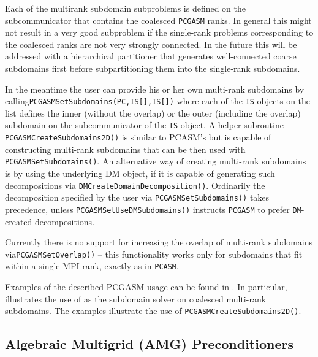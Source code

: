 Each of the multirank subdomain subproblems is defined on the subcommunicator that contains the coalesced
\lstinline{PCGASM} ranks.  In general this might not result in a very good subproblem if the single-rank problems
corresponding to the coalesced ranks are not very strongly connected.  In the future this will be addressed
with a hierarchical partitioner that generates well-connected coarse subdomains first before subpartitioning
them into the single-rank subdomains.

In the meantime the user can provide his or her own multi-rank subdomains by calling\break \lstinline{PCGASMSetSubdomains(PC,IS[],IS[])}
where each of the \lstinline{IS} objects on the list defines the inner (without the overlap) or the outer (including the overlap)
subdomain on the subcommunicator of the \lstinline{IS} object.  A helper subroutine \lstinline{PCGASMCreateSubdomains2D()} is similar
to PCASM's but is capable of constructing multi-rank subdomains that can be then used with \lstinline{PCGASMSetSubdomains()}.
An alternative way of creating multi-rank subdomains is by using the underlying DM object, if it is capable of generating
such decompositions via \lstinline{DMCreateDomainDecomposition()}. Ordinarily the decomposition specified by the user via
\lstinline{PCGASMSetSubdomains()} takes precedence, unless \lstinline{PCGASMSetUseDMSubdomains()} instructs \lstinline{PCGASM} to prefer \lstinline{DM}-created
decompositions.

Currently there is no support for increasing the overlap of multi-rank subdomains via\break \lstinline{PCGASMSetOverlap()} -- this
functionality works only for subdomains that fit within a single MPI rank, exactly as in \lstinline{PCASM}.

Examples of the described PCGASM usage can be found in \href{https://www.mcs.anl.gov/petsc/petsc-current/docs/manualpages/PC/PCGASM.html}{}.
In particular, 
illustrates the use of  as the subdomain solver on
coalesced multi-rank subdomains. The  examples illustrate the use of \lstinline{PCGASMCreateSubdomains2D()}.


\subsection{Algebraic Multigrid (AMG) Preconditioners}
\label{sec_amg}

